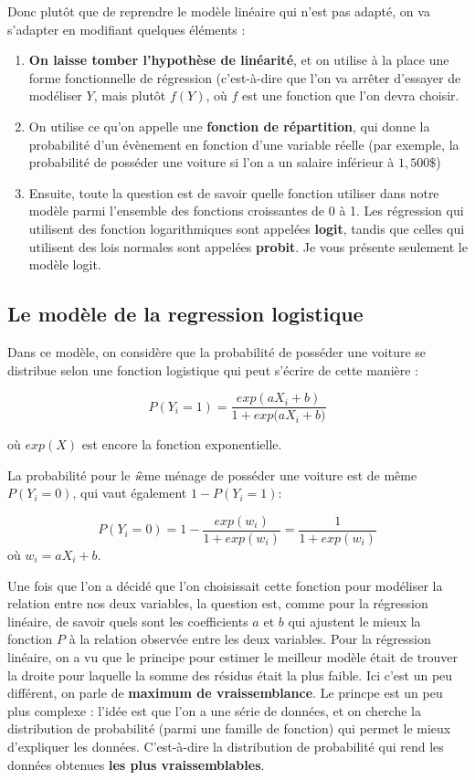 \documentclass[
  french,
]{book}
\providecommand{\tightlist}{%
  \setlength{\itemsep}{0pt}\setlength{\parskip}{0pt}}
\begin{document}
Donc plutôt que de reprendre le modèle linéaire qui n'est pas adapté, on va s'adapter en modifiant quelques éléments :

\begin{enumerate}
\def\labelenumi{\arabic{enumi}.}
\tightlist
\item
  \textbf{On laisse tomber l'hypothèse de linéarité}, et on utilise à la place une forme fonctionnelle de régression (c'est-à-dire que l'on va arrêter d'essayer de modéliser \(Y\), mais plutôt \(f(Y)\), où \(f\) est une fonction que l'on devra choisir.
\item
  On utilise ce qu'on appelle une \textbf{fonction de répartition}, qui donne la probabilité d'un évènement en fonction d'une variable réelle (par exemple, la probabilité de posséder une voiture si l'on a un salaire inférieur à \(1,500 \$\))
\item
  Ensuite, toute la question est de savoir quelle fonction utiliser dans notre modèle parmi l'ensemble des fonctions croissantes de 0 à 1. Les régression qui utilisent des fonction logarithmiques sont appelées \textbf{logit}, tandis que celles qui utilisent des lois normales sont appelées \textbf{probit}. Je vous présente seulement le modèle logit.
\end{enumerate}

\hypertarget{le-moduxe8le-de-la-regression-logistique}{%
\subsection{Le modèle de la regression logistique}\label{le-moduxe8le-de-la-regression-logistique}}

Dans ce modèle, on considère que la probabilité de posséder une voiture se distribue selon une fonction logistique qui peut s'écrire de cette manière :

\[ P(Y_i = 1) = \frac{exp({aX_i+b})}{1+exp({aX_i+b)}} \]

où \(exp(X)\) est encore la fonction exponentielle.

La probabilité pour le \emph{i}ème ménage de posséder une voiture est de même \(P(Y_i = 0)\), qui vaut également \(1- P(Y_i=1)\):

\[ P(Y_i=0) = 1 - \frac{exp(w_i)}{1+exp(w_i)} = \frac{1}{1+exp(w_i)}\] où \(w_i = aX_i+b\).

Une fois que l'on a décidé que l'on choisissait cette fonction pour modéliser la relation entre nos deux variables, la question est, comme pour la régression linéaire, de savoir quels sont les coefficients \(a\) et \(b\) qui ajustent le mieux la fonction \(P\) à la relation observée entre les deux variables. Pour la régression linéaire, on a vu que le principe pour estimer le meilleur modèle était de trouver la droite pour laquelle la somme des résidus était la plus faible. Ici c'est un peu différent, on parle de \textbf{maximum de vraissemblance}. Le princpe est un peu plus complexe : l'idée est que l'on a une série de données, et on cherche la distribution de probabilité (parmi une famille de fonction) qui permet le mieux d'expliquer les données. C'est-à-dire la distribution de probabilité qui rend les données obtenues \textbf{les plus vraissemblables}.
\end{document}
